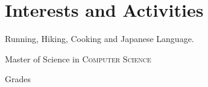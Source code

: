 \documentclass[a4paper,10pt]{article} %
\begin{document}

\section{Interests and Activities}

Running, Hiking, Cooking and Japanese Language.


\newpage


\par{\centering\Large \hypertarget{grds_ms}{Master of Science in \textsc{Computer Science}}\par}
\large{\centering Grades\par}\normalsize
\end{document}
